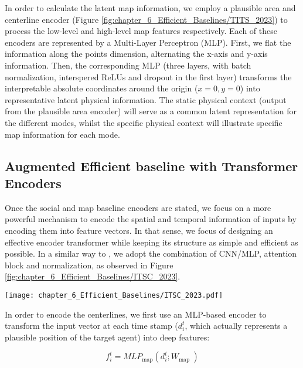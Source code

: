 In order to calculate the latent map information, we employ a plausible area and centerline encoder (Figure \ref{fig:chapter_6_Efficient_Baselines/TITS_2023}) to process the low-level and high-level map features respectively. Each of these encoders are represented by a Multi-Layer Perceptron (MLP). First, we flat the information along the points dimension, alternating the x-axis and y-axis information. Then, the corresponding MLP (three layers, with batch normalization, interspered ReLUs and dropout in the first layer) transforms the interpretable absolute coordinates around the origin ($x=0, y=0$) into representative latent physical information. The static physical context (output from the plausible area encoder) will serve as a common latent representation for the different modes, whilst the specific physical context will illustrate specific map information for each mode.

\subsection{Augmented Efficient baseline with Transformer Encoders}
\label{subsec:6_augmented_baseline}

Once the social and map baseline encoders are stated, we focus on a more powerful mechanism to encode the spatial and temporal information of inputs by encoding them into feature vectors. In that sense, we focus of designing an effective encoder transformer while keeping its structure as simple and efficient as possible. In a similar way to \cite{wang2023lane}, we adopt the combination of CNN/MLP, attention block and normalization, as observed in Figure \ref{fig:chapter_6_Efficient_Baselines/ITSC_2023}.

\begin{figure*}[!ht]
	\centering
	\setlength{\tabcolsep}{2.0pt}
	\texttt{[image: chapter\_6\_Efficient\_Baselines/ITSC\_2023.pdf]}
	\caption{Efficient baseline with transformer encoders to process the physical and social input}	
	\label{fig:chapter_6_Efficient_Baselines/ITSC_2023}
\end{figure*}

In order to encode the centerlines, we first use an MLP-based encoder to transform the input vector at each time stamp ($d_i^t$, which actually represents a plausible position of the target agent) into deep features:

\begin{equation}
	f_i^t=MLP_{\text{map}}\left(d_i^t ; W_{\text {map }}\right)
\end{equation}

